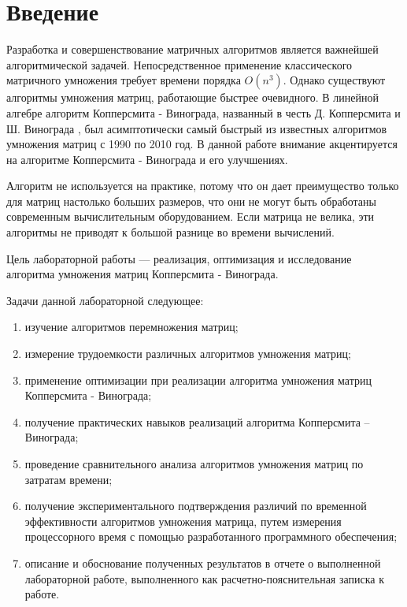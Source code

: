 
\chapter*{Введение}

Разработка и совершенствование матричных алгоритмов является важнейшей алгоритмической задачей. Непосредственное применение классического матричного умножения требует времени порядка $O(n^3)$. Однако существуют алгоритмы умножения матриц, работающие быстрее очевидного. В линейной алгебре алгоритм Копперсмита - Винограда\cite{winograd-origin}, названный в честь Д. Копперсмита и Ш. Винограда , был асимптотически самый быстрый из известных алгоритмов умножения матриц с 1990 по 2010 год. В данной работе внимание акцентируется на алгоритме Копперсмита - Винограда и его улучшениях. 

Алгоритм не используется на практике, потому что он дает преимущество только для матриц настолько больших размеров, что они не могут быть обработаны современным вычислительным оборудованием. Если матрица не велика, эти алгоритмы не приводят к большой разнице во времени вычислений. 

Цель лабораторной работы --- реализация, оптимизация и исследование алгоритма умножения матриц Копперсмита - Винограда.

\newpage

Задачи данной лабораторной следующее:

\begin{enumerate}[label=\arabic*)]
	\item изучение алгоритмов перемножения матриц;
	
	\item измерение трудоемкости различных алгоритмов умножения матриц;
	
	\item применение оптимизации при реализации алгоритма умножения матриц Копперсмита - Винограда;
	
	\item получение практических навыков реализаций алгоритма Копперсмита – Винограда;
	
	\item проведение сравнительного анализа алгоритмов умножения матриц по затратам времени;
	
	\item получение экспериментального подтверждения различий по временной эффективности алгоритмов умножения матрица, путем измерения процессорного время с помощью разработанного программного обеспечения;
	
	\item описание и обоснование полученных результатов в отчете о выполненной лабораторной работе, выполненного как расчетно-пояснительная записка к работе. 
\end{enumerate}